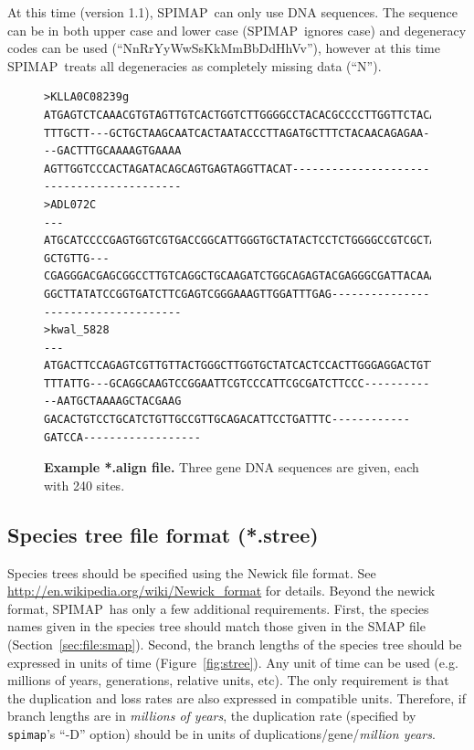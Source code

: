 \documentclass[11pt]{article}
\newcommand{\figref}[1]{Figure~\ref{#1}}
\newcommand{\secref}[1]{Section~\ref{#1}}
\newcommand{\spimap}{{\sf\scshape SPIMAP}}
\begin{document}
At this time (version 1.1), \spimap\ can only use DNA sequences.  The
sequence can be in both upper case and lower case (\spimap\ ignores
case) and degeneracy codes can be used (``NnRrYyWwSsKkMmBbDdHhVv''),
however at this time \spimap\ treats all degeneracies as completely
missing data (``N'').


\begin{figure}
\begin{center}
\begin{lstlisting}[frame=tblr]
>KLLA0C08239g
ATGAGTCTCAAACGTGTAGTTGTCACTGGTCTTGGGGCCTACACGCCCCTTGGTTCTACAGTTTCAAAGTCTTGGGCAGG
TTTGCTT---GCTGCTAAGCAATCACTAATACCCTTAGATGCTTTCTACAACAGAGAA---GACTTTGCAAAAGTGAAAA
AGTTGGTCCCACTAGATACAGCAGTGAGTAGGTTACAT------------------------------------------
>ADL072C
---ATGCATCCCCGAGTGGTCGTGACCGGCATTGGGTGCTATACTCCTCTGGGGCCGTCGCTAGCCCAGTCTTGGAAGGA
GCTGTTG---CGAGGGACGAGCGGCCTTGTCAGGCTGCAAGATCTGGCAGAGTACGAGGGCGATTACAAACCACTGTCGA
GGCTTATATCCGGTGATCTTCGAGTCGGGAAAGTTGGATTTGAG------------------------------------
>kwal_5828
---ATGACTTCCAGAGTCGTTGTTACTGGGCTTGGTGCTATCACTCCACTTGGGAGGACTGTTTCCGAGTCATGGAGAGC
TTTATTG---GCAGGCAAGTCCGGAATTCGTCCCATTCGCGATCTTCCC------------AATGCTAAAAGCTACGAAG
GACACTGTCCTGCATCTGTTGCCGTTGCAGACATTCCTGATTTC------------GATCCA------------------
\end{lstlisting}
\end{center}

\caption{{\bf Example *.align file.} Three gene DNA sequences
are given, each with 240 sites.}
\label{fig:align}
\end{figure}


\subsection{Species tree file format (*.stree)}
\label{sec:file:stree}

Species trees should be specified using the Newick file format.  See
\url{http://en.wikipedia.org/wiki/Newick\_format} for details.  Beyond
the newick format, \spimap\ has only a few additional requirements.
First, the species names given in the species tree should match those
given in the SMAP file (\secref{sec:file:smap}).  Second, the branch
lengths of the species tree should be expressed in units of time
(\figref{fig:stree}).  Any unit of time can be used (e.g. millions of
years, generations, relative units, etc).  The only requirement is
that the duplication and loss rates are also expressed in compatible
units.  Therefore, if branch lengths are in {\em millions of years},
the duplication rate (specified by {\tt spimap}'s ``-D'' option)
should be in units of duplications/gene/{\em million years}.
\end{document}

